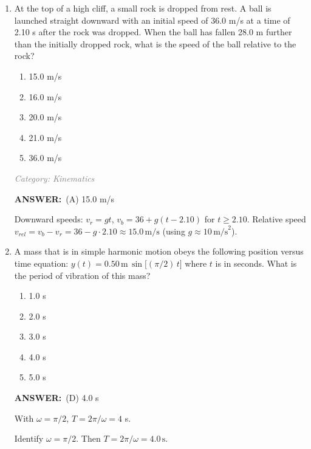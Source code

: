 \documentclass[12pt, a4paper]{article}
\makeatletter
\newcommand{\finalanswer}[1]{\textbf{ANSWER:}~#1}
\newif\if@categoryprinted
\newcommand{\category}[1]{\if@categoryprinted\relax\else\textit{\textcolor{gray}{Category: #1}}\global\@categoryprintedtrue\fi}
\newcommand{\tags}[1]{}
\makeatother
\begin{document}
\begin{CJK*}{UTF8}{gbsn}
\begin{enumerate}[itemsep=1.0em, topsep=0.6em]
\item \label{prob:30}
At the top of a high cliff, a small rock is dropped from rest. A ball is launched straight downward with an initial speed of 36.0 m/s at a time of 2.10 s after the rock was dropped. When the ball has fallen 28.0 m further than the initially dropped rock, what is the speed of the ball relative to the rock?
\begin{enumerate}[label=(\Alph*)]
    \item 15.0 m/s
    \item 16.0 m/s
    \item 20.0 m/s
    \item 21.0 m/s
    \item 36.0 m/s
\end{enumerate}

\category{Kinematics}
\begin{answerbox}
\finalanswer{(A) 15.0 m/s}
\end{answerbox}
\begin{solutionbox}

Downward speeds: $v_r=gt$, $v_b=36+g(t-2.10)$ for $t\ge2.10$. Relative speed $v_{rel}=v_b-v_r=36-g\cdot2.10\approx15.0\,\text{m/s}$ (using $g\approx10\,\text{m/s}^2$).
\end{solutionbox}

\newpage

\item \label{prob:31}
A mass that is in simple harmonic motion obeys the following position versus time equation: $y(t)=0.50\,\mathrm{m}\,\sin\big[(\pi/2)\,t\big]$ where $t$ is in seconds. What is the period of vibration of this mass?
\begin{enumerate}[label=(\Alph*)]
    \item 1.0 s
    \item 2.0 s
    \item 3.0 s
    \item 4.0 s
    \item 5.0 s
\end{enumerate}

\category{Oscillations} \tags{}
\begin{answerbox}
\finalanswer{(D) 4.0 s}
\end{answerbox}
\begin{insightbox}
With $\omega=\pi/2$, $T=2\pi/\omega=4$ s.
\end{insightbox}
\begin{solutionbox}

Identify $\omega=\pi/2$. Then $T=2\pi/\omega=4.0\,\text{s}$.
\end{solutionbox}


\end{enumerate}
\end{CJK*}
\end{document}
